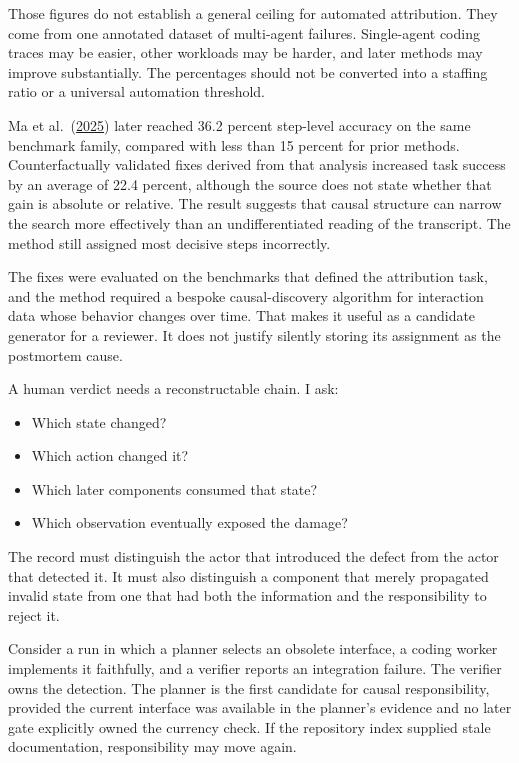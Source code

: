 Those figures do not establish a general ceiling for automated attribution. They come from one annotated dataset of multi-agent failures. Single-agent coding traces may be easier, other workloads may be harder, and later methods may improve substantially. The percentages should not be converted into a staffing ratio or a universal automation threshold.

Ma et al.~(\href{https://arxiv.org/abs/2509.08682}{2025}) later reached 36.2 percent step-level accuracy on the same benchmark family, compared with less than 15 percent for prior methods. Counterfactually validated fixes derived from that analysis increased task success by an average of 22.4 percent, although the source does not state whether that gain is absolute or relative. The result suggests that causal structure can narrow the search more effectively than an undifferentiated reading of the transcript. The method still assigned most decisive steps incorrectly.

The fixes were evaluated on the benchmarks that defined the attribution task, and the method required a bespoke causal-discovery algorithm for interaction data whose behavior changes over time. That makes it useful as a candidate generator for a reviewer. It does not justify silently storing its assignment as the postmortem cause.

A human verdict needs a reconstructable chain. I ask:

\begin{itemize}
\tightlist
\item
  Which state changed?
\item
  Which action changed it?
\item
  Which later components consumed that state?
\item
  Which observation eventually exposed the damage?
\end{itemize}

The record must distinguish the actor that introduced the defect from the actor that detected it. It must also distinguish a component that merely propagated invalid state from one that had both the information and the responsibility to reject it.

Consider a run in which a planner selects an obsolete interface, a coding worker implements it faithfully, and a verifier reports an integration failure. The verifier owns the detection. The planner is the first candidate for causal responsibility, provided the current interface was available in the planner's evidence and no later gate explicitly owned the currency check. If the repository index supplied stale documentation, responsibility may move again.

